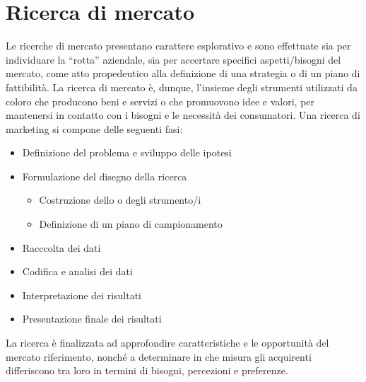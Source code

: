 \chapter{Ricerca di mercato}
Le ricerche di mercato presentano carattere esplorativo e sono effettuate sia per individuare la “rotta” aziendale, sia per accertare specifici aspetti/bisogni del mercato, come atto propedeutico alla definizione di una strategia o di un piano di fattibilità. La ricerca di mercato è, dunque, l’insieme degli strumenti utilizzati da coloro che producono beni e servizi o che promuovono idee e valori, per mantenersi in contatto con i bisogni e le necessità dei consumatori. \newline
Una ricerca di marketing si compone delle seguenti fasi:
\begin{itemize}
	\item Definizione del problema e sviluppo delle ipotesi
	\item Formulazione del disegno della ricerca
	\begin{itemize}
		\item Costruzione dello o degli strumento/i
		\item Definizione di un piano di campionamento
	\end{itemize}
	\item Racccolta dei dati
	\item Codifica e analisi dei dati
	\item Interpretazione dei risultati
	\item Presentazione finale dei risultati
\end{itemize}
La ricerca è finalizzata ad approfondire caratteristiche e le opportunità del mercato riferimento, nonché a determinare in che misura gli acquirenti differiscono tra loro in termini di bisogni, percezioni e preferenze.

